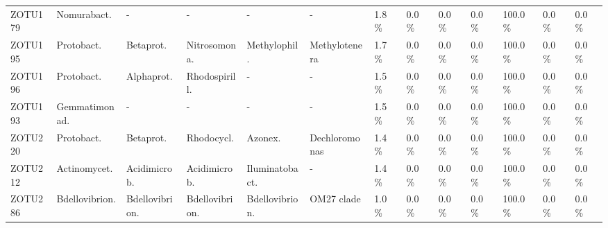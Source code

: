\begin{table}
\begin{adjustbox}{max width=0.7\textwidth, max totalheight=0.85\textheight, keepaspectratio}
\begin{tabular}{llllllllll||lll}
ZOTU179 & Nomurabact.    & -              & -              & -                & -            & \SI{1.8}{\percent}   & \SI{0.0}{\percent}  & \SI{0.0}{\percent}  & \SI{0.0}{\percent}  & \SI{100.0}{\percent} & \SI{0.0}{\percent}  & \SI{0.0}{\percent} \\
ZOTU195 & Protobact.     & Betaprot.      & Nitrosomona.   & Methylophil.    & Methylotenera & \SI{1.7}{\percent}   & \SI{0.0}{\percent}  & \SI{0.0}{\percent}  & \SI{0.0}{\percent}  & \SI{100.0}{\percent} & \SI{0.0}{\percent}  & \SI{0.0}{\percent} \\
ZOTU196 & Protobact.     & Alphaprot.     & Rhodospirill.  & -                & -            & \SI{1.5}{\percent}   & \SI{0.0}{\percent}  & \SI{0.0}{\percent}  & \SI{0.0}{\percent}  & \SI{100.0}{\percent} & \SI{0.0}{\percent}  & \SI{0.0}{\percent} \\
ZOTU193 & Gemmatimonad.  & -              & -              & -                & -            & \SI{1.5}{\percent}   & \SI{0.0}{\percent}  & \SI{0.0}{\percent}  & \SI{0.0}{\percent}  & \SI{100.0}{\percent} & \SI{0.0}{\percent}  & \SI{0.0}{\percent} \\
ZOTU220 & Protobact.     & Betaprot.      & Rhodocycl.     & Azonex.         & Dechloromonas & \SI{1.4}{\percent}   & \SI{0.0}{\percent}  & \SI{0.0}{\percent}  & \SI{0.0}{\percent}  & \SI{100.0}{\percent} & \SI{0.0}{\percent}  & \SI{0.0}{\percent} \\
ZOTU212 & Actinomycet.   & Acidimicrob.   & Acidimicrob.   & Iluminatobact.   & -            & \SI{1.4}{\percent}   & \SI{0.0}{\percent}  & \SI{0.0}{\percent}  & \SI{0.0}{\percent}  & \SI{100.0}{\percent} & \SI{0.0}{\percent}  & \SI{0.0}{\percent} \\
ZOTU286 & Bdellovibrion. & Bdellovibrion. & Bdellovibrion. & Bdellovibrion.   & OM27 clade   & \SI{1.0}{\percent}   & \SI{0.0}{\percent}  & \SI{0.0}{\percent}  & \SI{0.0}{\percent}  & \SI{100.0}{\percent} & \SI{0.0}{\percent}  & \SI{0.0}{\percent} \\
\bottomrule
\end{tabular}
\end{adjustbox}
\end{table}


